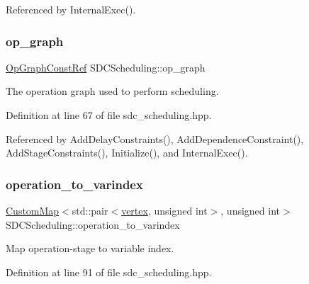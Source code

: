 Referenced by Internal\+Exec().

\mbox{\label{classSDCScheduling_acad9a2e9882b3b4e795008f1c2f412d8}} 
\subsubsection{\texorpdfstring{op\+\_\+graph}{op\_graph}}
{\footnotesize\ttfamily \hyperlink{op__graph_8hpp_a9a0b240622c47584bee6951a6f5de746}{Op\+Graph\+Const\+Ref} S\+D\+C\+Scheduling\+::op\+\_\+graph\hspace{0.3cm}{\ttfamily [protected]}}



The operation graph used to perform scheduling. 



Definition at line 67 of file sdc\+\_\+scheduling.\+hpp.



Referenced by Add\+Delay\+Constraints(), Add\+Dependence\+Constraint(), Add\+Stage\+Constraints(), Initialize(), and Internal\+Exec().

\mbox{\label{classSDCScheduling_a5f9740ba599a1ec7528cbd098de603bf}} 
\subsubsection{\texorpdfstring{operation\+\_\+to\+\_\+varindex}{operation\_to\_varindex}}
{\footnotesize\ttfamily \hyperlink{custom__map_8hpp_a18ca01763abbe3e5623223bfe5aaac6b}{Custom\+Map}$<$std\+::pair$<$\hyperlink{graph_8hpp_abefdcf0544e601805af44eca032cca14}{vertex}, unsigned int$>$, unsigned int$>$ S\+D\+C\+Scheduling\+::operation\+\_\+to\+\_\+varindex\hspace{0.3cm}{\ttfamily [protected]}}



Map operation-\/stage to variable index. 



Definition at line 91 of file sdc\+\_\+scheduling.\+hpp.



